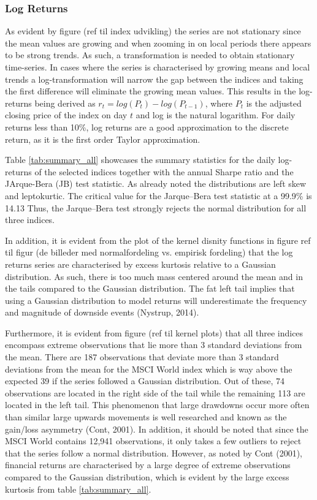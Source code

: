 \subsubsection{Log Returns}
As evident by figure (ref til index udvikling) the series are not stationary since the mean values are growing and when zooming in on local periods there appears to be strong trends. As such, a transformation is needed to obtain stationary time-series. In cases where the series is characterised by growing means and local trends a log-transformation will narrow the gap between the indices and taking the first difference will eliminate the growing mean values. This results in the log-returns being derived as $r_t = log(P_t) - log(P_{t-1})$, where $P_t$ is the adjusted closing price of the index on day $t$ and log is the natural logarithm. For daily returns less than 10\%, log returns are a good approximation to the discrete return, as it is the first order Taylor approximation.

Table \ref{tab:summary_all} showcases the summary statistics for the daily log-returns of the selected indices together with the annual Sharpe ratio and the JArque-Bera (JB) test statistic. As already noted the distributions are left skew and leptokurtic. The critical value for the Jarque–Bera test statistic at a 99.9\% is 14.13 Thus, the Jarque–Bera test strongly rejects the normal distribution for all three indices.  

In addition, it is evident from the plot of the kernel disnity functions in figure ref til figur (de billeder med normalfordeling vs. empirisk fordeling) that the log returns series are characterised by excess kurtosis relative to a Gaussian distribution. As such, there is too much mass centered around the mean and in the tails compared to the Gaussian distribution. The fat left tail implies that using a Gaussian distribution to model returns will underestimate the frequency and magnitude of downside events (Nystrup, 2014). 


Furthermore, it is evident from figure (ref til kernel plots) that all three indices encompass extreme observations that lie more than 3 standard deviations from the mean. There are 187 observations that deviate more than 3 standard deviations from the mean for the MSCI World index which is way above the expected 39 if the series followed a Gaussian distribution. Out of these, 74 observations are located in the right side of the tail while the remaining 113 are located in the left tail. This phenomenon that large drawdowns occur more often than similar large upwards movements is well researched and known as the gain/loss asymmetry (Cont, 2001). In addition, it should be noted that since the MSCI World contains 12,941 observations, it only takes a few outliers to reject that the series follow a normal distribution. However, as noted by Cont (2001), financial returns are characterised by a large degree of extreme observations compared to the Gaussian distribution, which is evident by the large excess kurtosis from table \ref{tab:summary_all}.

